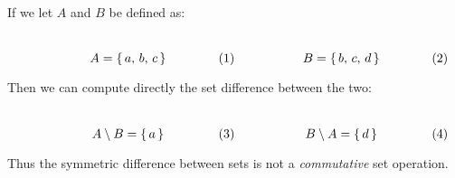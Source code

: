         \begin{example}
            If we let $A$ and $B$ be defined as:
            \par
            \begin{subequations}
                \begin{minipage}[b]{0.49\textwidth}
                    \centering
                    \begin{equation}
                        A=\{\,a,\,b,\,c\,\}
                    \end{equation}
                \end{minipage}
                \hfill
                \begin{minipage}[b]{0.49\textwidth}
                    \centering
                    \begin{equation}
                        B=\{\,b,\,c,\,d\,\}
                    \end{equation}
                \end{minipage}
            \end{subequations}
            \par\vspace{2.5ex}
            Then we can compute directly the set difference between the two:
            \par
            \begin{subequations}
                \begin{minipage}[b]{0.49\textwidth}
                    \centering
                    \begin{equation}
                        A\setminus{B}=\{\,a\,\}
                    \end{equation}
                \end{minipage}
                \hfill
                \begin{minipage}[b]{0.49\textwidth}
                    \centering
                    \begin{equation}
                        B\setminus{A}=\{\,d\,\}
                    \end{equation}
                \end{minipage}
            \end{subequations}
            \par\vspace{2.5ex}
            Thus the symmetric difference between sets is not a
            \textit{commutative} set operation.
        \end{example}
